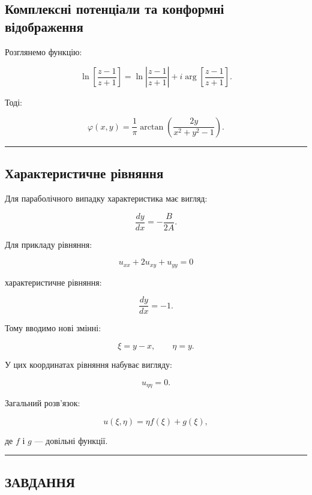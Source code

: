 \documentclass[
  ukrainian,
]{article}
\begin{document}
\subsection{Комплексні потенціали та конформні
відображення}\label{ux43aux43eux43cux43fux43bux435ux43aux441ux43dux456-ux43fux43eux442ux435ux43dux446ux456ux430ux43bux438-ux442ux430-ux43aux43eux43dux444ux43eux440ux43cux43dux456-ux432ux456ux434ux43eux431ux440ux430ux436ux435ux43dux43dux44f}

Розглянемо функцію:

\[
\ln\left[\frac{z-1}{z+1}\right]
= \ln\left|\frac{z-1}{z+1}\right|
+ i \arg\left[\frac{z-1}{z+1}\right].
\]

Тоді:

\[
\varphi(x,y)=\frac{1}{\pi}\arctan\left(\frac{2y}{x^2+y^2-1}\right).
\]

\begin{center}\rule{0.5\linewidth}{0.5pt}\end{center}

\subsection{Характеристичне
рівняння}\label{ux445ux430ux440ux430ux43aux442ux435ux440ux438ux441ux442ux438ux447ux43dux435-ux440ux456ux432ux43dux44fux43dux43dux44f}

Для параболічного випадку характеристика має вигляд:

\[
\frac{dy}{dx} = -\frac{B}{2A}.
\]

Для прикладу рівняння:

\[
u_{xx} + 2u_{xy} + u_{yy} = 0
\]

характеристичне рівняння:

\[
\frac{dy}{dx} = -1.
\]

Тому вводимо нові змінні:

\[
\xi = y - x, \qquad \eta = y.
\]

У цих координатах рівняння набуває вигляду:

\[
u_{\eta\eta} = 0.
\]

Загальний розв'язок:

\[
u(\xi,\eta) = \eta f(\xi) + g(\xi),
\]

де \(f\) і \(g\) --- довільні функції.

\begin{center}\rule{0.5\linewidth}{0.5pt}\end{center}

\subsection{ЗАВДАННЯ}\label{ux437ux430ux432ux434ux430ux43dux43dux44f-14}
\end{document}
